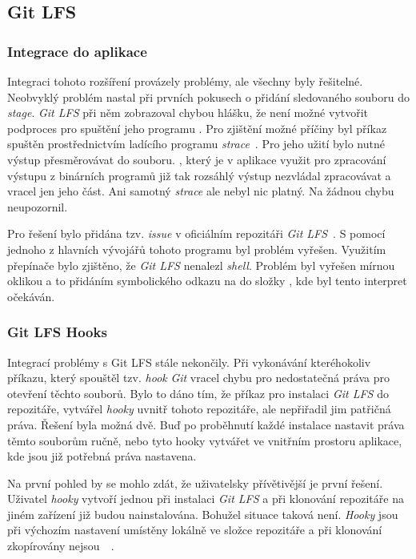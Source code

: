     \subsection{Git LFS}\label{sec:problemy_lfs}
    \subsubsection{Integrace do aplikace}
    Integraci tohoto rozšíření provázely problémy, ale všechny byly řešitelné. Neobvyklý problém nastal při prvních pokusech o přidání sledovaného souboru do \emph{stage}. \emph{Git LFS} při něm zobrazoval chybou hlášku, že není možné vytvořit podproces pro spuštění jeho programu . Pro zjištění možné příčiny byl příkaz  spuštěn prostřednictvím ladícího programu \emph{strace}~. Pro jeho užití bylo nutné výstup přesměrovávat do souboru. , který je v aplikace využit pro zpracování výstupu z binárních programů již tak rozsáhlý výstup nezvládal zpracovávat a vracel jen jeho část. Ani samotný \emph{strace} ale nebyl nic platný. Na žádnou chybu neupozornil.
    
    Pro řešení bylo přidána tzv. \emph{issue} v oficiálním repozitáři \emph{Git LFS}~. S pomocí jednoho z hlavních vývojářů tohoto programu byl problém vyřešen. Využitím přepínače  bylo zjištěno, že \emph{Git LFS} nenalezl \emph{shell}. Problém byl vyřešen mírnou oklikou a to přidáním symbolického odkazu na  do složky , kde byl tento interpret očekáván.

    \newpage
    \subsubsection{Git LFS Hooks}
    Integrací problémy s Git LFS stále nekončily. Při vykonávání kteréhokoliv příkazu, který spouštěl tzv. \emph{hook} \emph{Git} vracel chybu pro nedostatečná práva pro otevření těchto souborů. Bylo to dáno tím, že příkaz pro instalaci \emph{Git LFS} do repozitáře, vytvářel \emph{hooky} uvnitř tohoto repozitáře, ale nepřiřadil jim patřičná práva. Řešení byla možná dvě. Buď po proběhnutí každé instalace nastavit práva těmto souborům ručně, nebo tyto hooky vytvářet ve vnitřním prostoru aplikace, kde jsou již potřebná práva nastavena.
    
    Na první pohled by se mohlo zdát, že uživatelsky přívětivější je první řešení. Uživatel \emph{hooky} vytvoří jednou při instalaci \emph{Git LFS} a při klonování repozitáře na jiném zařízení již budou nainstalována. Bohužel situace taková není. \emph{Hooky} jsou při výchozím nastavení umístěny lokálně ve složce  repozitáře a při klonování zkopírovány nejsou~~.

